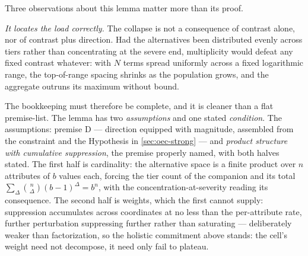 \documentclass[11pt]{article}
\theoremstyle{definition}
\begin{document}
Three observations about this lemma matter more than its proof.

\emph{It locates the load correctly.} The collapse is not a consequence of contrast alone, nor of contrast plus direction. Had the alternatives been distributed evenly across tiers rather than concentrating at the severe end, multiplicity would defeat any fixed contrast whatever: with $N$ terms spread uniformly across a fixed logarithmic range, the top-of-range spacing shrinks as the population grows, and the aggregate outruns its maximum without bound.

The bookkeeping must therefore be complete, and it is cleaner than a flat premise-list. The lemma has two \emph{assumptions} and one stated \emph{condition}. The assumptions: premise D --- direction equipped with magnitude, assembled from the constraint and the Hypothesis in \autoref{sec:oec-strong} --- and \emph{product structure with cumulative suppression}, the premise properly named, with both halves stated. The first half is cardinality: the alternative space is a finite product over $n$ attributes of $b$ values each, forcing the tier count of the companion \cite{Nexus} and its total $\sum_\Delta \binom{n}{\Delta}(b-1)^{\Delta} = b^{n}$, with the concentration-at-severity reading its consequence. The second half is weights, which the first cannot supply: suppression accumulates across coordinates at no less than the per-attribute rate, further perturbation suppressing further rather than saturating --- deliberately weaker than factorization, so the holistic commitment above stands: the cell's weight need not decompose, it need only fail to plateau.
\end{document}

